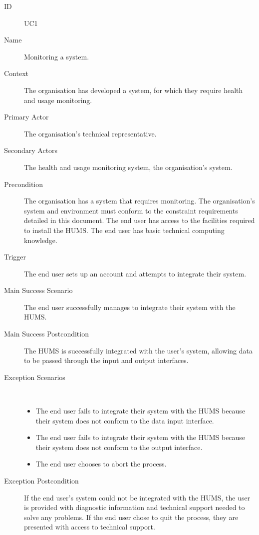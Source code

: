 \documentclass[10pt,a4paper]{article}
\begin{document}
\begin{description}
	\item[ID] UC1
	\item[Name] Monitoring a system.
	\item[Context] The organisation has developed a system, for which they
	               require health and usage monitoring.
	\item[Primary Actor] The organisation's technical representative.
	\item[Secondary Actors] The health and usage monitoring system, the
	                        organisation's system.
	\item[Precondition] The organisation has a system that requires monitoring.
	                    The organisation's system and environment must conform to
	                    the constraint requirements detailed in this document. The
	                    end user has access to the facilities required to install
	                    the HUMS. The end user has basic technical computing
	                    knowledge.
	\item[Trigger] The end user sets up an account and attempts to integrate
	               their system.
	\item[Main Success Scenario] The end user successfully manages to integrate
			their system with the HUMS.
	\item[Main Success Postcondition] The HUMS is successfully integrated with
			the user's system, allowing data to be passed through the input and output
			interfaces.
	\item[Exception Scenarios] ~
			\begin{itemize}
				\item The end user fails to integrate their system with the HUMS because
				      their system does not conform to the data input interface.
				\item The end user fails to integrate their system with the HUMS because
				      their system does not conform to the output interface.
				\item The end user chooses to abort the process.
			\end{itemize}
	\item[Exception Postcondition]
			If the end user's system could not be integrated with the HUMS, the user
			is provided with diagnostic information and technical support needed to
			solve any problems. If the end user chose to quit the process, they are
			presented with access to technical support.
\end{description}
\end{document}
